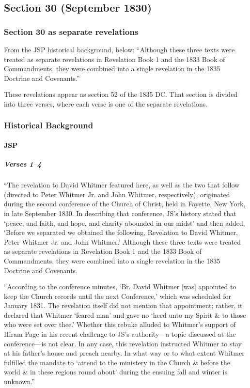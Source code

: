 \subsection{Section 30 (September 1830)}
	\label{DC30}
	
	\subsubsection{Section 30 as separate revelations}
	
		From the JSP historical background, below: ``Although these three texts were treated as separate revelations in Revelation Book 1 and the 1833 Book of Commandments, they were combined into a single revelation in the 1835 Doctrine and Covenants.''
		
		These revelations appear as section 52 of the 1835 DC. That section is divided into three verses, where each verse is one of the separate revelations.
	
	\subsubsection{Historical Background}
		\label{DC30-HB}
		
		\paragraph{JSP}
		
			\subparagraph{Verses 1--4}
			
				``The revelation to David Whitmer featured here, as well as the two that follow (directed to Peter Whitmer Jr. and John Whitmer, respectively), originated during the second conference of the Church of Christ, held in Fayette, New York, in late September 1830. In describing that conference, JS's history stated that `peace, and faith, and hope, and charity abounded in our midst' and then added, `Before we separated we obtained the following, Revelation to David Whitmer, Peter Whitmer Jr. and John Whitmer.' Although these three texts were treated as separate revelations in Revelation Book 1 and the 1833 Book of Commandments, they were combined into a single revelation in the 1835 Doctrine and Covenants.
				
				``According to the conference minutes, `Br. David Whitmer [was] appointed to keep the Church records until the next Conference,' which was scheduled for January 1831. The revelation itself did not mention that appointment; rather, it declared that Whitmer `feared man' and gave no `heed unto my Spirit \& to those who were set over thee.' Whether this rebuke alluded to Whitmer's support of Hiram Page in his recent challenge to JS's authority---a topic discussed at the conference---is not clear. In any case, this revelation instructed Whitmer to stay at his father's house and preach nearby. In what way or to what extent Whitmer fulfilled the mandate to `attend to the ministery in the Church \& before the world \& in these regions round about' during the ensuing fall and winter is unknown.''
				
